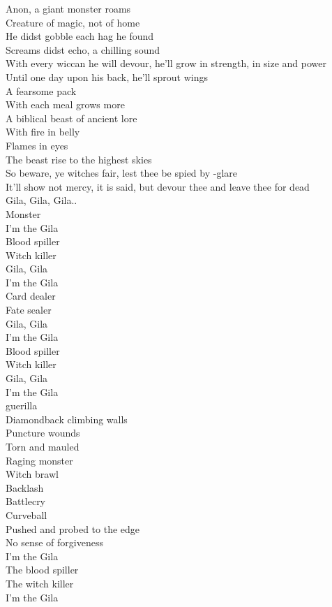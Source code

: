 
Anon, a giant monster roams \\
Creature of magic, not of home \\
He didst gobble each hag he found \\
Screams didst echo, a chilling sound \\
With every wiccan he will devour, he'll grow in strength, in size and power \\
Until one day upon his back, he'll sprout wings \\
A fearsome pack \\
With each meal  grows more \\
A biblical beast of ancient lore \\
With fire in belly \\
Flames in eyes \\
The beast rise to the highest skies \\
So beware, ye witches fair, lest thee be spied by -glare \\
It'll show not mercy, it is said, but devour thee and leave thee for dead \\

Gila, Gila, Gila.. \\
Monster \\

I'm the Gila \\
Blood spiller \\
Witch killer \\
Gila, Gila \\
I'm the Gila \\
Card dealer \\
Fate sealer \\
Gila, Gila \\
I'm the Gila \\
Blood spiller \\
Witch killer \\
Gila, Gila \\
I'm the Gila \\
 guerilla \\

Diamondback climbing walls \\
Puncture wounds \\
Torn and mauled \\
Raging monster \\
Witch brawl \\
Backlash \\
Battlecry \\
Curveball \\
Pushed and probed to the edge \\
No sense of forgiveness \\
I'm the Gila \\
The blood spiller \\
The witch killer \\
I'm the Gila \\

